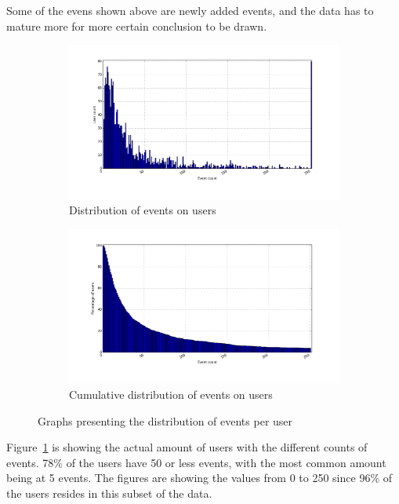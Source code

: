         Some of the evens shown above are newly added events, and the data has to mature more for more certain conclusion to be drawn.

    \begin{figure}[H]
        \centering
        \begin{subfigure}{.5\textwidth}
            \centering
            \includegraphics[width=\dualGraphWidth]{image/user_iddistribution.png}
            \caption{Distribution of events on users}
    \label{figure:userEventDist}
        \end{subfigure}%
        \begin{subfigure}{.5\textwidth}
            \centering
            \includegraphics[width=\dualGraphWidth]{image/user_idcumdistribution.png}
            \caption{Cumulative distribution of events on users}
    \label{figure:userEventCumDist}
        \end{subfigure}
        \caption{Graphs presenting the distribution of events per user}
    \end{figure}
        Figure~\ref{figure:userEventDist} is showing the actual amount of users with the different counts of events.
        78\% of the users have 50 or less events, with the most common amount being at 5 events.
        The figures are showing the values from 0 to 250 since 96\% of the users resides in this subset of the data.

